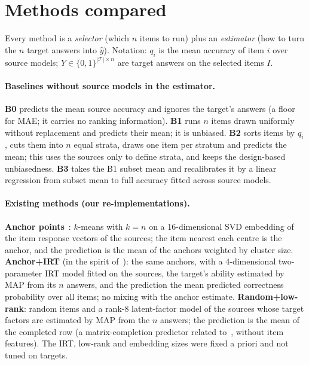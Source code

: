 \section{Methods compared}
\label{sec:methods}

Every method is a \emph{selector} (which $n$ items to run) plus an \emph{estimator} (how to turn the $n$ target answers into $\hat y$). Notation: $q_i$ is the mean accuracy of item $i$ over source models; $Y\in\{0,1\}^{|\mathcal T|\times n}$ are target answers on the selected items $I$.

\paragraph{Baselines without source models in the estimator.}
\textbf{B0} predicts the mean source accuracy and ignores the target's answers (a floor for MAE; it carries no ranking information). \textbf{B1} runs $n$ items drawn uniformly without replacement and predicts their mean; it is unbiased. \textbf{B2} sorts items by $q_i$, cuts them into $n$ equal strata, draws one item per stratum and predicts the mean; this uses the sources only to define strata, and keeps the design-based unbiasedness. \textbf{B3} takes the B1 subset mean and recalibrates it by a linear regression from subset mean to full accuracy fitted across source models.

\paragraph{Existing methods (our re-implementations).}
\textbf{Anchor points}~\citep{vivek2024anchor}: $k$-means with $k=n$ on a 16-dimensional SVD embedding of the item response vectors of the sources; the item nearest each centre is the anchor, and the prediction is the mean of the anchors weighted by cluster size. \textbf{Anchor+IRT} (in the spirit of~\citealp{mauricio2024tiny}): the same anchors, with a 4-dimensional two-parameter IRT model fitted on the sources, the target's ability estimated by MAP from its $n$ answers, and the prediction the mean predicted correctness probability over all items; no mixing with the anchor estimate. \textbf{Random+low-rank}: random items and a rank-8 latent-factor model of the sources whose target factors are estimated by MAP from the $n$ answers; the prediction is the mean of the completed row (a matrix-completion predictor related to~\citealp{pacchiardi2024100}, without item features). The IRT, low-rank and embedding sizes were fixed a priori and not tuned on targets.

